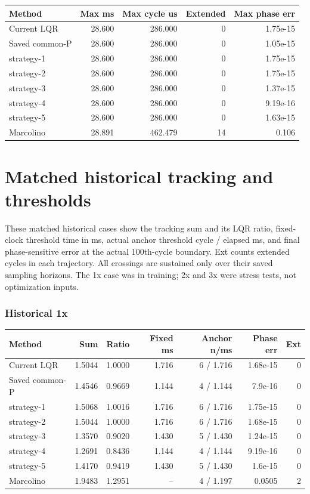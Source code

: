 \documentclass[11pt,a4paper]{article}
\begin{document}
\begin{center}\begin{tabular}{lrrrr}
\toprule
Method & Max ms & Max cycle us & Extended & Max phase err \\
\midrule
Current LQR & 28.600 & 286.000 & 0 & 1.75e-15 \\
Saved common-P & 28.600 & 286.000 & 0 & 1.05e-15 \\
strategy-1 & 28.600 & 286.000 & 0 & 1.75e-15 \\
strategy-2 & 28.600 & 286.000 & 0 & 1.75e-15 \\
strategy-3 & 28.600 & 286.000 & 0 & 1.37e-15 \\
strategy-4 & 28.600 & 286.000 & 0 & 9.19e-16 \\
strategy-5 & 28.600 & 286.000 & 0 & 1.63e-15 \\
Marcolino & 28.891 & 462.479 & 14 & 0.106 \\
\bottomrule
\end{tabular}\end{center}

\clearpage\section*{Matched historical tracking and thresholds}
These matched historical cases show the tracking sum and its LQR ratio, fixed-clock threshold time in ms, actual anchor threshold cycle / elapsed ms, and final phase-sensitive error at the actual 100th-cycle boundary. Ext counts extended cycles in each trajectory. All crossings are sustained only over their saved sampling horizons. The 1x case was in training; 2x and 3x were stress tests, not optimization inputs.
\subsubsection*{Historical 1x}
\begin{center}\begin{tabular}{lrrrrrr}
\toprule
Method & Sum & Ratio & Fixed ms & Anchor n/ms & Phase err & Ext \\
\midrule
Current LQR & 1.5044 & 1.0000 & 1.716 & 6 / 1.716 & 1.68e-15 & 0 \\
Saved common-P & 1.4546 & 0.9669 & 1.144 & 4 / 1.144 & 7.9e-16 & 0 \\
strategy-1 & 1.5068 & 1.0016 & 1.716 & 6 / 1.716 & 1.75e-15 & 0 \\
strategy-2 & 1.5044 & 1.0000 & 1.716 & 6 / 1.716 & 1.68e-15 & 0 \\
strategy-3 & 1.3570 & 0.9020 & 1.430 & 5 / 1.430 & 1.24e-15 & 0 \\
strategy-4 & 1.2691 & 0.8436 & 1.144 & 4 / 1.144 & 9.19e-16 & 0 \\
strategy-5 & 1.4170 & 0.9419 & 1.430 & 5 / 1.430 & 1.6e-15 & 0 \\
Marcolino & 1.9483 & 1.2951 & -- & 4 / 1.197 & 0.0505 & 2 \\
\bottomrule
\end{tabular}\end{center}
\end{document}
